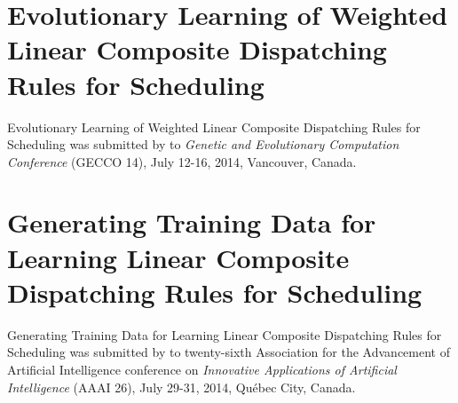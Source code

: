 

\section[GECCO14]{Evolutionary Learning of Weighted Linear Composite Dispatching Rules for Scheduling}\label{app:gecco14}
Evolutionary Learning of Weighted Linear Composite Dispatching Rules for Scheduling was submitted by \citeauthor{InRu14a} to \emph{Genetic and Evolutionary Computation Conference} (GECCO 14), July 12-16, 2014, Vancouver, Canada. %




\section[AAAI14]{Generating Training Data for Learning Linear Composite Dispatching Rules for Scheduling}\label{app:aaai14}
Generating Training Data for Learning Linear Composite Dispatching Rules for Scheduling was submitted by \citeauthor{InRu14b} to twenty-sixth {Association for the Advancement of Artificial Intelligence} conference on \emph{Innovative Applications of Artificial Intelligence} (AAAI 26), July 29-31, 2014, Québec City, Canada. %


